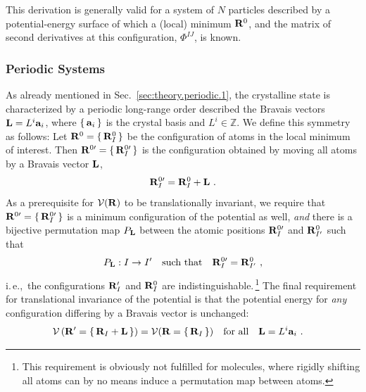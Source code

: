 This derivation is generally valid for a system of $N$ particles described by a potential-energy surface of which a (local) minimum ${\bf R}^0$, and the matrix of second derivatives at this configuration, $\Phi^{IJ}$, is known.

\subsubsection{Periodic Systems}
As already mentioned in Sec.~\ref{sec:theory.periodic.1}, the crystalline state is characterized by a periodic long-range order described the Bravais vectors ${\bf L} = L^i {\bf a}_i$, where $\set{{\bf a}_i}$ is the crystal basis and $L^i \in \mathds Z$.
We define this symmetry as follows:
Let ${\bf R}^0 = \set{{\bf R}_I^0}$ be the configuration of atoms in the local minimum of interest. Then ${\bf R}^{0 \prime} = \set{{\bf R}^{0 \prime}_{I}}$ is the configuration obtained by moving all atoms by a Bravais vector ${\bf L}$,
\begin{align}
	{\bf R}^{0 \prime}_{I} = {\bf R}^0_{I} + {\bf L}~.
	\label{eq:RI'}
\end{align}
As a prerequisite for $\mathcal V ({\bf R})$ to be translationally invariant, we require that ${\bf R}^{0 \prime} = \set{{\bf R}^{0 \prime}_{I}}$ is a minimum configuration of the potential as well, \emph{and} there is a bijective permutation map $P_{\bf L}$ between the atomic positions ${\bf R}^{0 \prime}_{I}$ and ${\bf R}^{0}_{I'}$ such that
\begin{align}
	P_{\bf L} : I \to I' \quad\text{such that}\quad
	{\bf R}^{0 \prime}_{I}
		= {\bf R}^{0}_{I'}~,
	\label{eq:translation.permutation}
\end{align}
i.\,e.,~the configurations ${\bf R}'_{I}$ and ${\bf R}^{0}_{I}$ are indistinguishable.\,\footnote{This requirement is obviously not fulfilled for molecules, where rigidly shifting all atoms can by no means induce a permutation map between atoms.} 
The final requirement for translational invariance of the potential is that the potential energy for \emph{any} configuration differing by a Bravais vector is unchanged:
\begin{align}
	\mathcal{V} \left( {\bf R}' = \set{{\bf R}_{I} + {\bf L}} \right)
	&= \mathcal{V}({\bf R} = \set{{\bf R}_{I}} ) 
	\quad\text{for all}\quad {\bf L} = L^i {\bf a}_i~.
	\label{eq:inv.V}
\end{align}
